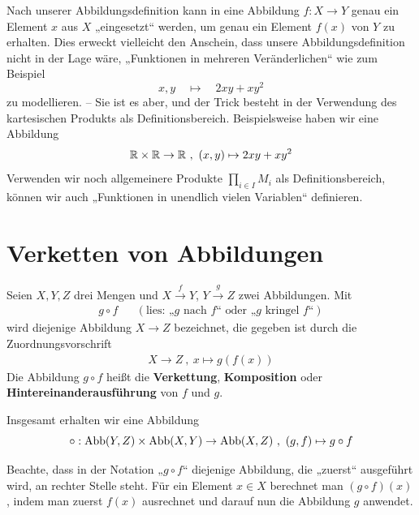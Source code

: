 \begin{bem}
    Nach unserer Abbildungsdefinition kann in eine Abbildung $f:X\to Y$ genau ein Element $x$ aus $X$ „eingesetzt“ werden, um genau ein Element $f(x)$ von $Y$ zu erhalten. Dies erweckt vielleicht den Anschein, dass unsere Abbildungsdefinition nicht in der Lage wäre, „Funktionen in mehreren Veränderlichen“ wie zum Beispiel
        \[ x,y \quad\mapsto\quad 2xy + xy^2 \]
    zu modellieren. -- Sie ist es aber, und der Trick besteht in der Verwendung des kartesischen Produkts als Definitionsbereich. Beispielsweise haben wir eine Abbildung
        \[ \mathbb R \times \mathbb R \to \mathbb R \ ,\ (x,y) \mapsto 2xy +xy^2 \]
    Verwenden wir noch allgemeinere Produkte $\prod_{i\in I} M_i$ als Definitionsbereich, können wir auch „Funktionen in unendlich vielen Variablen“ definieren.
\end{bem}





\section{Verketten von Abbildungen}


\begin{de}\label{def:verkettung} 
    Seien $X,Y,Z$ drei Mengen und $X\xrightarrow{f} Y$, $Y \xrightarrow{g} Z$ zwei Abbildungen. Mit
    \begin{align*}
        g\circ f && (\text{lies: „$g$ nach $f$“ oder „$g$ kringel $f$“})
    \end{align*}
    wird diejenige Abbildung $X\to Z$ bezeichnet, die gegeben ist durch die Zuordnungsvorschrift
    \begin{align*}
        X \to Z \ ,\ x \mapsto g(f(x))
    \end{align*}
    Die Abbildung $g\circ f$ heißt die \textbf{Verkettung}, \textbf{Komposition} oder \textbf{Hintereinanderausführung} von $f$ und $g$.
    
    Insgesamt erhalten wir eine Abbildung
        \[ \circ : \Abb(Y,Z)\times \Abb(X,Y) \to \Abb(X,Z) \ ,\ (g,f) \mapsto g\circ f\]
\end{de}


\begin{bem}
    Beachte, dass in der Notation „$g\circ f$“ diejenige Abbildung, die „zuerst“ ausgeführt wird, an rechter Stelle steht. Für ein Element $x \in X$ berechnet man $(g\circ f)(x)$, indem man zuerst $f(x)$ ausrechnet und darauf nun die Abbildung $g$ anwendet.
\end{bem}



